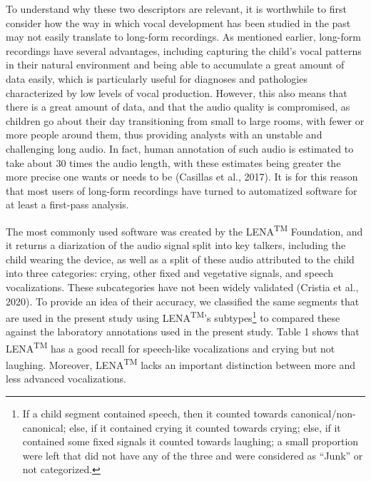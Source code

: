 \documentclass[english,,man,floatsintext]{apa6}
\begin{document}
To understand why these two descriptors are relevant, it is worthwhile to first consider how the way in which vocal development has been studied in the past may not easily translate to long-form recordings. As mentioned earlier, long-form recordings have several advantages, including capturing the child's vocal patterns in their natural environment and being able to accumulate a great amount of data easily, which is particularly useful for diagnoses and pathologies characterized by low levels of vocal production. However, this also means that there is a great amount of data, and that the audio quality is compromised, as children go about their day transitioning from small to large rooms, with fewer or more people around them, thus providing analysts with an unstable and challenging long audio. In fact, human annotation of such audio is estimated to take about 30 times the audio length, with these estimates being greater the more precise one wants or needs to be (Casillas et al., 2017). It is for this reason that most users of long-form recordings have turned to automatized software for at least a first-pass analysis.

The most commonly used software was created by the LENA\textsuperscript{TM} Foundation, and it returns a diarization of the audio signal split into key talkers, including the child wearing the device, as well as a split of these audio attributed to the child into three categories: crying, other fixed and vegetative signals, and speech vocalizations. These subcategories have not been widely validated (Cristia et al., 2020). To provide an idea of their accuracy, we classified the same segments that are used in the present study using LENA\textsuperscript{TM}'s subtypes\footnote{If a child segment contained speech, then it counted towards canonical/non-canonical; else, if it contained crying it counted towards crying; else, if it contained some fixed signals it counted towards laughing; a small proportion were left that did not have any of the three and were considered as \enquote{Junk} or not categorized.} to compared these against the laboratory annotations used in the present study. Table 1 shows that LENA\textsuperscript{TM} has a good recall for speech-like vocalizations and crying but not laughing. Moreover, LENA\textsuperscript{TM} lacks an important distinction between more and less advanced vocalizations.
\end{document}
